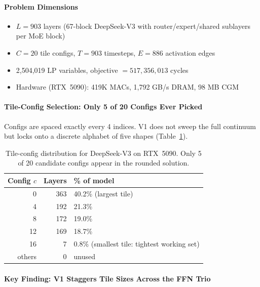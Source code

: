 \paragraph{Problem Dimensions}

\begin{itemize}[leftmargin=1.4em, itemsep=2pt]
    \item $L = 903$ layers (67-block DeepSeek-V3 with
          router/expert/shared sublayers per MoE block)
    \item $C = 20$ tile configs, $T = 903$ timesteps,
          $E = 886$ activation edges
    \item 2{,}504{,}019 LP variables,
          objective $= 517{,}356{,}013$ cycles
    \item Hardware (RTX~5090): 419K MACs, 1{,}792 GB/s DRAM,
          98 MB CGM
\end{itemize}

\paragraph{Tile-Config Selection: Only 5 of 20 Configs Ever Picked}

Configs are spaced exactly every 4 indices. V1 does not sweep the full continuum but locks onto a discrete alphabet of five shapes (Table~\ref{tab:ds_tile_configs}).

\begin{table}[ht!]
\centering
\caption{Tile-config distribution for DeepSeek-V3 on RTX~5090.
Only 5 of 20 candidate configs appear in the rounded solution.}
\label{tab:ds_tile_configs}
\begin{tabular}{rrl}
\toprule
\textbf{Config $c$} & \textbf{Layers} & \textbf{\% of model} \\
\midrule
0  & 363 & 40.2\% \quad (largest tile) \\
4  & 192 & 21.3\% \\
8  & 172 & 19.0\% \\
12 & 169 & 18.7\% \\
16 &   7 &  0.8\% \quad (smallest tile: tightest working set) \\
\midrule
others & 0 & unused \\
\bottomrule
\end{tabular}
\end{table}

\paragraph{Key Finding: V1 Staggers Tile Sizes Across the FFN Trio}

